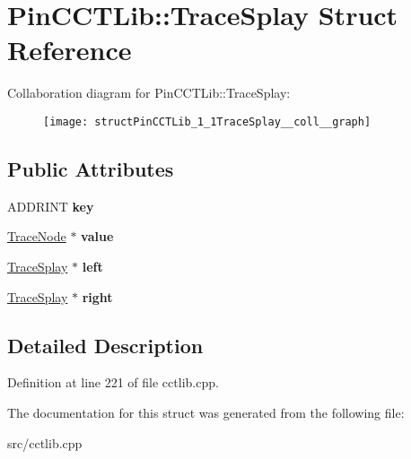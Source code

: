 \hypertarget{structPinCCTLib_1_1TraceSplay}{\section{Pin\-C\-C\-T\-Lib\-:\-:Trace\-Splay Struct Reference}
\label{structPinCCTLib_1_1TraceSplay}
}


Collaboration diagram for Pin\-C\-C\-T\-Lib\-:\-:Trace\-Splay\-:
\nopagebreak
\begin{figure}[H]
\begin{center}
\leavevmode
\texttt{[image: structPinCCTLib\_1\_1TraceSplay\_\_coll\_\_graph]}
\end{center}
\end{figure}
\subsection*{Public Attributes}
\begin{DoxyCompactItemize}
\item 
\hypertarget{structPinCCTLib_1_1TraceSplay_a888daea69b609ac41235910cecb6ef8c}{A\-D\-D\-R\-I\-N\-T {\bfseries key}}\label{structPinCCTLib_1_1TraceSplay_a888daea69b609ac41235910cecb6ef8c}

\item 
\hypertarget{structPinCCTLib_1_1TraceSplay_a56ccddc8138e50c2d66231f3a7a3f262}{\hyperlink{structPinCCTLib_1_1TraceNode}{Trace\-Node} $\ast$ {\bfseries value}}\label{structPinCCTLib_1_1TraceSplay_a56ccddc8138e50c2d66231f3a7a3f262}

\item 
\hypertarget{structPinCCTLib_1_1TraceSplay_a59bb033e6a97bb52308ce843e0304064}{\hyperlink{structPinCCTLib_1_1TraceSplay}{Trace\-Splay} $\ast$ {\bfseries left}}\label{structPinCCTLib_1_1TraceSplay_a59bb033e6a97bb52308ce843e0304064}

\item 
\hypertarget{structPinCCTLib_1_1TraceSplay_afa7608aad60bf7f20c947aa73adf08e1}{\hyperlink{structPinCCTLib_1_1TraceSplay}{Trace\-Splay} $\ast$ {\bfseries right}}\label{structPinCCTLib_1_1TraceSplay_afa7608aad60bf7f20c947aa73adf08e1}

\end{DoxyCompactItemize}


\subsection{Detailed Description}


Definition at line 221 of file cctlib.\-cpp.



The documentation for this struct was generated from the following file\-:\begin{DoxyCompactItemize}
\item 
src/cctlib.\-cpp\end{DoxyCompactItemize}
